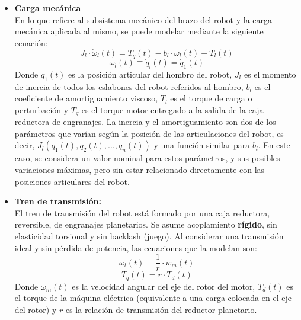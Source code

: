 \documentclass[10pt]{article}
\begin{document}
\begin{itemize}
	\item \textbf{Carga mecánica}\vspace{0.3cm}\\
	En lo que refiere al subsistema mecánico del brazo del robot y la carga mecánica aplicada al mismo, se puede modelar mediante la siguiente ecuación:
	\begin{equation}
		\label{eqn:cargaMecanica}
		J_{l}\cdot \dot{\omega }_{l}\left ( t \right )=T_{q}\left ( t \right )-b_{l}\cdot \omega_{l}\left ( t \right )-T_{l}\left ( t \right )
	\end{equation}
	\begin{equation}
		\omega_{l}\left ( t \right )\equiv \dot{q}_{l}\left ( t \right )= \dot{q}_1\left ( t \right )
	\end{equation}
	Donde $q_{1}(t)$ es la posición articular del hombro del robot, $J_{l}$ es el momento de inercia de todos los eslabones del robot referidos al hombro, $b_{l}$ es el coeficiente de amortiguamiento viscoso, $T_{l}$ es el torque de carga o perturbación y $T_{q}$ es el torque motor entregado a la salida de la caja reductora de engranajes.
	La inercia y el amortiguamiento son dos de los parámetros que varían según la posición de las articulaciones del robot, es decir, $J_{l}(q_{1}(t),q_{2}(t),...,q_{n}(t))$ y una función similar para $b_{l}$.
	En este caso, se considera un valor nominal para estos parámetros, y sus posibles variaciones máximas, pero sin estar relacionado directamente con las posiciones articulares del robot.
	
	\item \textbf{Tren de transmisión:}\vspace{0.3cm}\\
	El tren de transmisión del robot está formado por una caja reductora, reversible, de engranajes planetarios. Se asume acoplamiento \textbf{rígido}, sin elasticidad torsional y sin backlash (juego). Al considerar una transmisión ideal y sin pérdida de potencia, las ecuaciones que la modelan son:
	\begin{equation}
		\label{eqn:relacionTransmision}
		\omega_{l}\left ( t \right )=\frac{1}{r}\cdot w_{m}\left ( t \right )
	\end{equation}
	\begin{equation}
		\label{eqn:torqueTransmision}
		T_{q}\left ( t \right )=r\cdot T_{d}\left ( t \right )
	\end{equation}
	Donde $\omega_{m}(t)$ es la velocidad angular del eje del rotor del motor, $T_{d}(t)$ es el torque de la máquina eléctrica (equivalente a una carga colocada en el eje del rotor) y $r$ es la relación de transmisión del reductor planetario.
	

\end{itemize}
\end{document}

